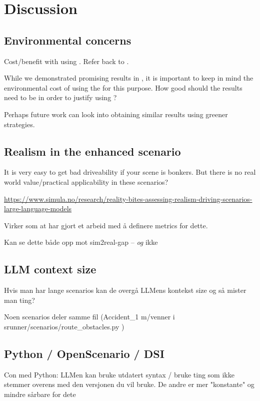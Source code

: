 
\chapter{Discussion}
\section{Environmental concerns}
Cost/benefit with using . Refer back to .

While we demonstrated promising results in , it is important to keep in mind the
environmental cost of using the  for this purpose. How good should the results need
to be in order to justify using ?

Perhaps future work can look into obtaining similar results using greener strategies.

\section{Realism in the enhanced scenario}

It is very easy to get bad driveability if your scene is bonkers. But there is no real world
value/practical applicability in these scenarios?

\url{https://www.simula.no/research/reality-bites-assessing-realism-driving-scenarios-large-language-models}

Virker som at \cite{LLMScenarioChang24} har gjort et arbeid med å definere metrics for dette.

Kan se dette både opp mot sim2real-gap -- \emph{og} ikke


\section{LLM context size}

Hvis man har lange scenarios kan de overgå LLMens kontekst size og så mister man ting?

Noen scenarios deler samme fil (Accident\_1 m/venner i srunner/scenarios/route\_obstacles.py )

\section{Python / OpenScenario / DSI}

Con med Python: LLMen kan bruke utdatert syntax / bruke ting som ikke stemmer overens med den
versjonen du vil bruke. De andre er mer "konstante" og mindre sårbare for dete